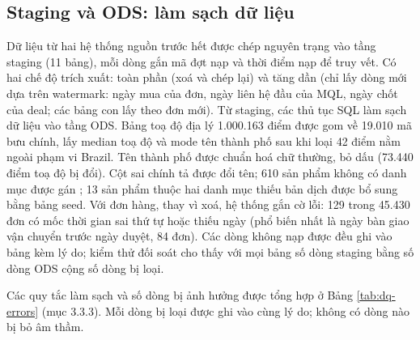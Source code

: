 \subsection{Staging và ODS: làm sạch dữ liệu}
Dữ liệu từ hai hệ thống nguồn trước hết được chép nguyên trạng vào tầng staging (11 bảng), mỗi dòng gắn mã đợt nạp và thời điểm nạp để truy vết. Có hai chế độ trích xuất: toàn phần (xoá và chép lại) và tăng dần (chỉ lấy dòng mới dựa trên watermark: ngày mua của đơn, ngày liên hệ đầu của MQL, ngày chốt của deal; các bảng con lấy theo đơn mới). Từ staging, các thủ tục SQL làm sạch dữ liệu vào tầng ODS. Bảng toạ độ địa lý 1.000.163 điểm được gom về 19.010 mã bưu chính, lấy median toạ độ và mode tên thành phố sau khi loại 42 điểm nằm ngoài phạm vi Brazil. Tên thành phố được chuẩn hoá chữ thường, bỏ dấu (73.440 điểm toạ độ bị đổi). Cột sai chính tả  được đổi tên; 610 sản phẩm không có danh mục được gán ; 13 sản phẩm thuộc hai danh mục thiếu bản dịch được bổ sung bằng bảng seed. Với đơn hàng, thay vì xoá, hệ thống gắn cờ lỗi: 129 trong 45.430 đơn có mốc thời gian sai thứ tự hoặc thiếu ngày (phổ biến nhất là ngày bàn giao vận chuyển trước ngày duyệt, 84 đơn). Các dòng không nạp được đều ghi vào bảng  kèm lý do; kiểm thử đối soát cho thấy với mọi bảng số dòng staging bằng số dòng ODS cộng số dòng bị loại.

Các quy tắc làm sạch và số dòng bị ảnh hưởng được tổng hợp ở Bảng \ref{tab:dq-errors} (mục 3.3.3). Mỗi dòng bị loại được ghi vào  cùng lý do; không có dòng nào bị bỏ âm thầm.
